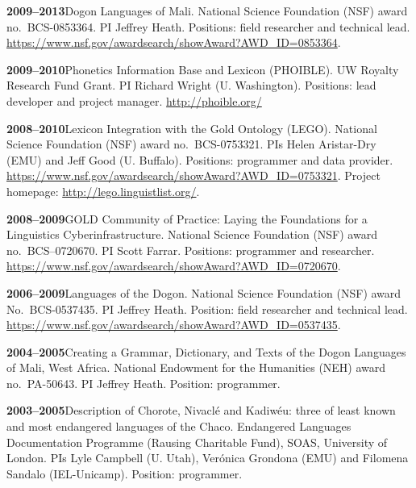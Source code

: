 \documentclass[11pt]{article}
\newcommand{\hangpara}{
 \setlength{\parindent}{0in} %
 \hangindent=0.42in %
}
\begin{document}
\vskip 6pt
\hangpara
{\bf 2009--2013}\hspace{1ex}Dogon Languages of Mali. National Science Foundation (NSF) award no.\ BCS-0853364. PI Jeffrey Heath. Positions: field researcher and technical lead. \url{https://www.nsf.gov/awardsearch/showAward?AWD_ID=0853364}.

\vskip 6pt
\hangpara
{\bf 2009--2010}\hspace{1ex}Phonetics Information Base and Lexicon (PHOIBLE). UW Royalty Research Fund Grant. PI Richard Wright (U. Washington). Positions: lead developer and project manager. \url{http://phoible.org/}

\vskip 6pt
\hangpara
{\bf 2008--2010}\hspace{1ex}Lexicon Integration with the Gold Ontology (LEGO). National Science Foundation (NSF) award no.\ BCS-0753321. PIs Helen Aristar-Dry (EMU) and Jeff Good (U. Buffalo). Positions: programmer and data provider. \url{https://www.nsf.gov/awardsearch/showAward?AWD_ID=0753321}. Project homepage: \url{http://lego.linguistlist.org/}.

\vskip 6pt
\hangpara
{\bf 2008--2009}\hspace{1ex}GOLD Community of Practice: Laying the Foundations for a Linguistics Cyberinfrastructure. National Science Foundation (NSF) award no.\ BCS--0720670. PI Scott Farrar. Positions: programmer and researcher. \url{https://www.nsf.gov/awardsearch/showAward?AWD_ID=0720670}. %

\vskip 6pt
\hangpara
{\bf 2006--2009}\hspace{1ex}Languages of the Dogon. National Science Foundation (NSF) award No.\ BCS-0537435. PI Jeffrey Heath. Position: field researcher and technical lead. \url{https://www.nsf.gov/awardsearch/showAward?AWD_ID=0537435}.

\vskip 6pt
\hangpara
{\bf 2004--2005}\hspace{1ex}Creating a Grammar, Dictionary, and Texts of the Dogon Languages of Mali, West Africa. National Endowment for the Humanities (NEH) award no.\ PA-50643. PI Jeffrey Heath. Position: programmer.

\vskip 6pt
\hangpara
{\bf 2003--2005}\hspace{1ex}Description of Chorote, Nivacl{\'e} and Kadiw{\'e}u: three of least known and most endangered languages of the Chaco. Endangered Languages Documentation Programme (Rausing Charitable Fund), SOAS, University of London. PIs Lyle Campbell (U. Utah), Ver{\'o}nica Grondona (EMU) and Filomena Sandalo (IEL-Unicamp). Position: programmer.
\end{document}
